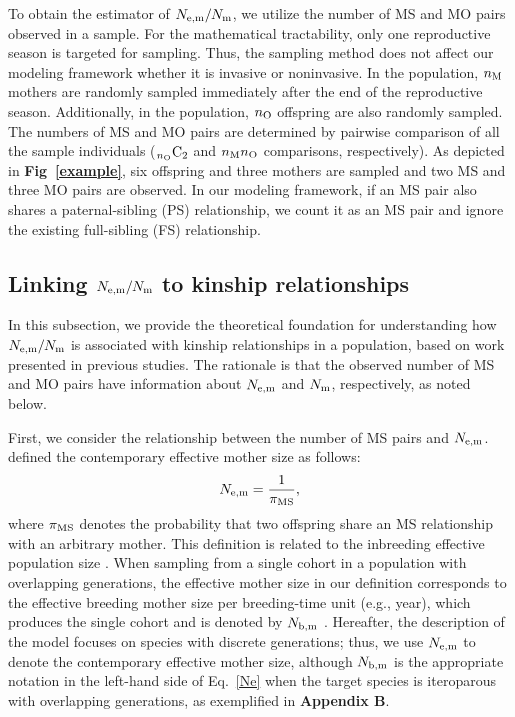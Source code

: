 \documentclass[12pt, English]{article}
\begin{document}
\begin{spacing}{1.9}
To obtain the estimator of $N_{\rm e,m}/N_{\rm m}$, we utilize the number of MS and MO pairs observed in a sample. For the mathematical tractability, only one reproductive season is targeted for sampling. Thus, the sampling method does not affect our modeling framework whether it is invasive or noninvasive. In the population, $n_{\rm M}$ mothers are randomly sampled immediately after the end of the reproductive season. Additionally, in the population, $n_{\rm O}$ offspring are also randomly sampled. The numbers of MS and MO pairs are determined by pairwise comparison of all the sample individuals (${}_{n_{\rm O}}\mathrm{C}_2$ and $n_{\rm M}n_{\rm O}$ comparisons, respectively). As depicted in {\bf Fig~\ref{example}}, six offspring and three mothers are sampled and two MS and three MO pairs are observed. In our modeling framework, if an MS pair also shares a paternal-sibling (PS) relationship, we count it as an MS pair and ignore the existing full-sibling (FS) relationship. 
\subsection{Linking $N_{\rm e,m}/N_{\rm m}$ to kinship relationships}

In this subsection, we provide the theoretical foundation for understanding how $N_{\rm e,m}/N_{\rm m}$ is associated with kinship relationships in a population, based on work presented in previous studies. The rationale is that the observed number of MS and MO pairs have information about $N_{\rm e,m}$ and $N_{\rm m}$, respectively, as noted below. 

First, we consider the relationship between the number of MS pairs and $N_{\rm e,m}$. \cite{Akita_2019} defined the contemporary effective mother size as follows: 
\begin{equation}
N_{\rm e,m} = \frac{1}{\pi_{\rm MS}},
\label{Ne}
\end{equation}
where $\pi_{\rm MS}$ denotes the probability that two offspring share an MS relationship with an arbitrary mother. This definition is related to the inbreeding effective population size \cite[]{nordborg2002separation,wang2009new}. When sampling from a single cohort in a population with overlapping generations, the effective mother size in our definition corresponds to the effective breeding mother size per breeding-time unit (e.g., year), which produces the single cohort and is denoted by $N_{\rm b,m}$ \cite[]{waples1991genetic}. Hereafter, the description of the model focuses on species with discrete generations; thus, we use $N_{\rm e,m}$ to denote the contemporary effective mother size, although $N_{\rm b,m}$ is the appropriate notation in the left-hand side of Eq.~\ref{Ne} when the target species is iteroparous with overlapping generations, as exemplified in {\bf Appendix B}. 


\end{spacing}
\end{document}
